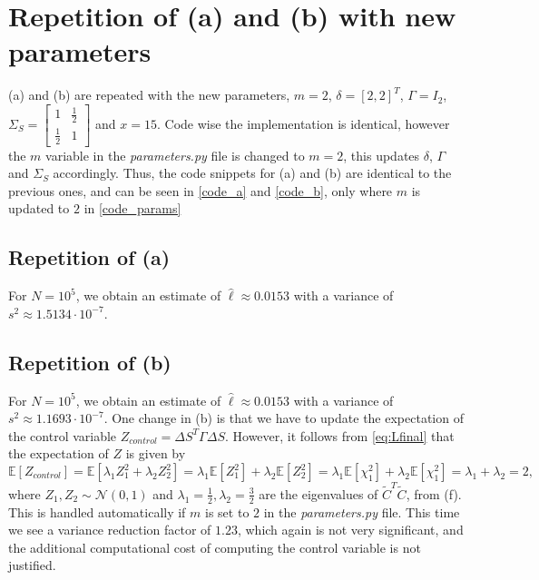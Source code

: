 \documentclass{article}
\begin{document}
\section{Repetition of (a) and (b) with new parameters}
(a) and (b) are repeated with the new parameters, $m=2$, $\delta = [2, 2]^T$, $\Gamma = I_2$, $\Sigma_S = \begin{bmatrix}
1 & \frac{1}{2}\\
\frac{1}{2} & 1
\end{bmatrix}$ and $x = 15$. Code wise the implementation is identical, however the $m$ variable in the \emph{parameters.py} file is changed to $m = 2$, this updates $\delta$, $\Gamma$ and $\Sigma_S$ accordingly. Thus, the code snippets for (a) and (b) are identical to the previous ones, and can be seen in \autoref{code_a} and \autoref{code_b}, only where $m$ is updated to $2$ in \autoref{code_params}

\subsection{Repetition of (a)}
For $N = 10^5$, we obtain an estimate of $\hat{\ell} \approx 0.0153$ with a variance of $s^2 \approx 1.5134\cdot 10^{-7}$.

\subsection{Repetition of (b)}
For $N = 10^5$, we obtain an estimate of $\hat{\ell} \approx 0.0153$ with a variance of $s^2 \approx 1.1693\cdot 10^{-7}$. One change in (b) is that we have to update the expectation of the control variable $Z_{control} = \Delta S^T\Gamma\Delta S$. However, it follows from \eqref{eq:Lfinal} that the expectation of $Z$ is given by
\begin{equation*}
    \mathbb{E}[Z_{control}] = \mathbb{E}[\lambda_1Z_1^2 + \lambda_2Z_2^2] = \lambda_1\mathbb{E}[Z_1^2] + \lambda_2\mathbb{E}[Z_2^2] = \lambda_1\mathbb{E}[\chi^2_1] + \lambda_2\mathbb{E}[\chi^2_1] = \lambda_1 + \lambda_2 = 2,
\end{equation*}
where $Z_1, Z_2 \sim \mathcal{N}(0, 1)$ and $\lambda_1 = \frac{1}{2}, \lambda_2 = \frac{3}{2}$ are the eigenvalues of $\tilde{C}^T\tilde{C}$, from (f). This is handled automatically if $m$ is set to $2$ in the \emph{parameters.py} file. This time we see a variance reduction factor of $ 1.23$, which again is not very significant, and the additional computational cost of computing the control variable is not justified.
\end{document}
